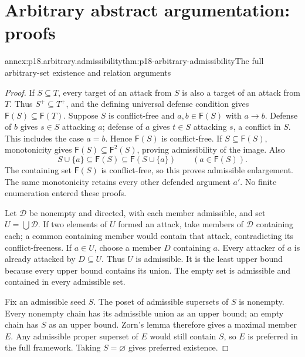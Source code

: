 \section{Arbitrary abstract argumentation: proofs}
\label{sec:annex-p18-arbitrary-argumentation}

\begin{annexitem}{annex:p18.arbitrary.admissibility}{thm:p18-arbitrary-admissibility}{The full arbitrary-set existence and relation arguments}
\begin{proof}
If \(S\subseteq T\), every target of an attack from \(S\)
is also a target of an attack from \(T\). Thus
\(S^+\subseteq T^+\), and the defining universal
defense condition gives \(\mathsf F(S)\subseteq\mathsf F(T)\).
Suppose \(S\) is conflict-free and \(a,b\in\mathsf F(S)\)
with \(a\to b\). Defense of \(b\) gives \(s\in S\)
attacking \(a\); defense of \(a\) gives \(t\in S\)
attacking \(s\), a conflict in \(S\). This includes
the case \(a=b\). Hence \(\mathsf F(S)\) is
conflict-free. If \(S\subseteq\mathsf F(S)\),
monotonicity gives
\(\mathsf F(S)\subseteq\mathsf F^2(S)\), proving
admissibility of the image. Also
\[
 S\cup\{a\}\subseteq\mathsf F(S)
                   \subseteq\mathsf F(S\cup\{a\})
                \qquad(a\in\mathsf F(S)).
\]
The containing set \(\mathsf F(S)\) is conflict-free,
so this proves admissible enlargement. The same
monotonicity retains every other defended argument
\(a'\). No finite enumeration entered these proofs.

Let \(\mathcal D\) be nonempty and directed, with
each member admissible, and set \(U=\bigcup\mathcal D\).
If two elements of \(U\) formed an attack, take
members of \(\mathcal D\) containing each; a
common containing member would contain that attack,
contradicting its conflict-freeness. If \(a\in U\),
choose a member \(D\) containing \(a\).
Every attacker of \(a\) is already attacked by
\(D\subseteq U\). Thus \(U\) is admissible.
It is the least upper bound because every upper
bound contains its union. The empty set is
admissible and contained in every admissible set.

Fix an admissible seed \(S\). The poset of
admissible supersets of \(S\) is nonempty.
Every nonempty chain has its admissible union
as an upper bound; an empty chain has \(S\)
as an upper bound. Zorn's lemma therefore
gives a maximal member \(E\). Any admissible
proper superset of \(E\) would still contain
\(S\), so \(E\) is preferred in the full
framework. Taking \(S=\varnothing\) gives
preferred existence.


\end{proof}
\end{annexitem}
